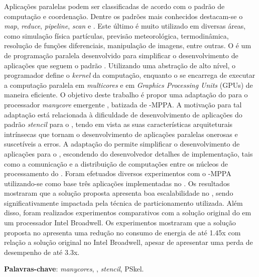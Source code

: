 
\setlength{\absparsep}{18pt} %
\begin{resumo}
Aplicações paralelas podem ser classificadas de acordo com o padrão de
computação e coordenação. Dentre os padrões mais conhecidos destacam-se o
\textit{map}, \textit{reduce}, \textit{pipeline}, \textit{scan} e \stencil.
Este último é muito utilizado em diversas áreas, como
simulação física partículas, previsão meteorológica, termodinâmica, resolução de
funções diferenciais, manipulação de imagens, entre outras. O \pskel é um \fw de
programação paralela desenvolvido para simplificar o desenvolvimento de
aplicações que seguem o padrão \stencil. Utilizando uma abstração de alto nível, o
programador define o \emph{kernel} da computação, enquanto o \fw se encarrega de
executar a computação paralela em \textit{multicores} e em \textit{Graphics Processing Units}
(GPUs) de maneira eficiente.
%
O objetivo deste trabalho é propor uma adaptação do \fw \pskel
para o processador \textit{manycore} emergente \mppa, batizada de \pskel-MPPA. A
motivação para tal adaptação está relacionada à dificuldade de desenvolvimento
de aplicações do padrão \textit{stencil} para o \mppa, tendo em vista as suas
características arquiteturais intrínsecas que tornam o desenvolvimento de
aplicações paralelas onerosas e suscetíveis a erros. A adaptação do \fw permite simplificar
o desenvolvimento de aplicações \stencil para o \mppa, escondendo do desenvolvedor detalhes de
implementação, tais como a comunicação e a distribuição de computações entre os
núcleos de processamento do \mppa.
%
Foram efetuados diversos experimentos com o \pskel-MPPA utilizando-se como base
três aplicações \stencil implementadas no \pskel. Os resultados mostraram que a solução
proposta apresenta boa escalabilidade no \mppa, sendo significativamente impactada
pela técnica de particionamento utilizada. Além disso, foram realizados experimentos
comparativos com a solução original do \pskel em um processador Intel Broadwell.
Os experimentos mostraram que a solução proposta no \mppa apresenta uma redução
no consumo de energia de até 1.45x com relação a solução original no Intel Broadwell,
apesar de apresentar uma perda de desempenho de até 3.3x.

 \textbf{Palavras-chave}: \textit{manycores}, \mppa, \textit{stencil}, PSkel.
\end{resumo}

